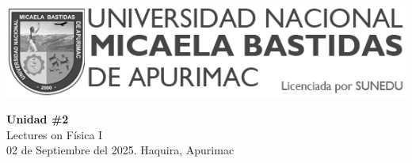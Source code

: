 


\begin{minipage}[l]{0.42\textwidth}
    \includegraphics[width=1\textwidth]{img/logo-UNAMBA.png}
\end{minipage}
\hfill
\begin{minipage}[c]{0.5\textwidth}
    \begin{flushright}
	\large{\textbf{Unidad \#2}}\\
	\large{Lectures on Física I}\\
	\large{02 de Septiembre del 2025. Haquira, Apurimac}\\
    \end{flushright}
\end{minipage}



